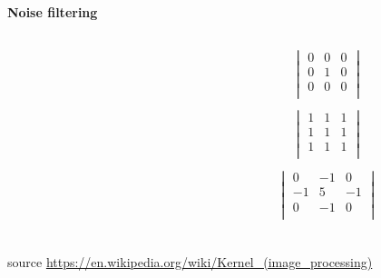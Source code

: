 \documentclass[xcolor=dvipsnames]{beamer}
\begin{document}
\begin{frame}{\bf Noise filtering}
\begin{columns}
\begin{column}{0.5\textwidth}
\end{column}
\begin{column}{0.5\textwidth}  %

  \scriptsize
  {
    \begin{align*}
    \begin{vmatrix}
        0 & 0 & 0 \\
        0 & 1 & 0 \\
        0 & 0 & 0 \\
    \end{vmatrix}\\
    \end{align*}
  }
  \scriptsize
  {
    \begin{align*}
    \begin{vmatrix}
        1 & 1 & 1 \\
        1 & 1 & 1 \\
        1 & 1 & 1 \\
    \end{vmatrix}\\
    \end{align*}
  }
  \scriptsize
  {
    \begin{align*}
    \begin{vmatrix}
        0 & -1 & 0 \\
        -1 & 5 & -1 \\
        0 & -1 & 0 \\
    \end{vmatrix}\\
    \end{align*}
  }
\end{column}
\end{columns}


{\tiny source \url{https://en.wikipedia.org/wiki/Kernel_(image_processing)}}

\end{frame}
\end{document}

